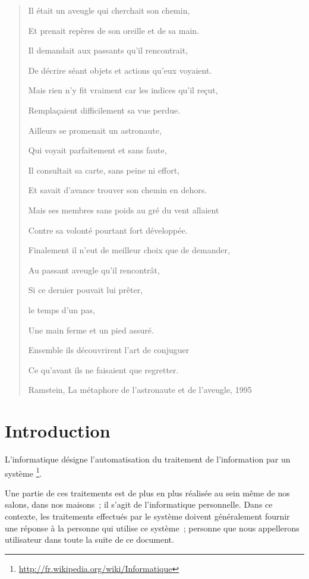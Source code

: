 \documentclass[
]{book}
\begin{document}
\begin{quote}
Il était un aveugle qui cherchait son chemin,

Et prenait repères de son oreille et de sa main.

Il demandait aux passants qu'il rencontrait,

De décrire séant objets et actions qu'eux voyaient.

Mais rien n'y fit vraiment car les indices qu'il reçut,

Remplaçaient difficilement sa vue perdue.

Ailleurs se promenait un astronaute,

Qui voyait parfaitement et sans faute,

Il consultait sa carte, sans peine ni effort,

Et savait d'avance trouver son chemin en dehors.

Mais ses membres sans poids au gré du vent allaient

Contre sa volonté pourtant fort développée.

Finalement il n'eut de meilleur choix que de demander,

Au passant aveugle qu'il rencontrât,

Si ce dernier pouvait lui prêter,

le temps d'un pas,

Une main ferme et un pied assuré.

Ensemble ils découvrirent l'art de conjuguer

Ce qu'avant ils ne faisaient que regretter.

Ramstein, La métaphore de l'astronaute et de l'aveugle, 1995
\end{quote}

\hypertarget{introduction}{%
\chapter*{Introduction}\label{introduction}}

L'informatique désigne l'automatisation du traitement de l'information par
un système \footnote{\url{http://fr.wikipedia.org/wiki/Informatique}}.

Une partie de ces traitements est de plus en plus réalisée au sein même de
nos salons, dans nos maisons~; il s'agit de l'informatique personnelle. Dans
ce contexte, les traitements effectués par le système doivent généralement
fournir une réponse à la personne qui utilise ce système~; personne que nous
appellerons utilisateur dans toute la suite de ce document.
\end{document}
